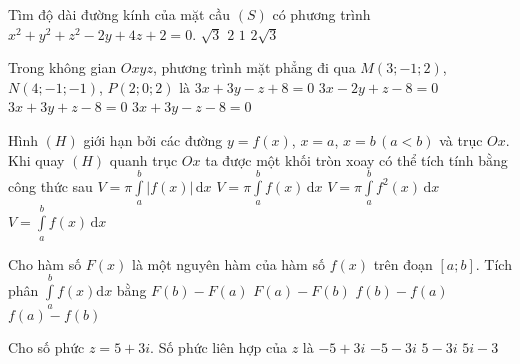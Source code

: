 \begin{ex}%
Tìm độ dài đường kính của mặt cầu $(S)$ có phương trình $x^2+y^2+z^2-2y+4z+2=0$.
\choice
{$\sqrt{3}$}
{$2$}
{$1$}
{\True $2\sqrt{3}$}
\end{ex}

\begin{ex}%
Trong không gian $O x y z$, phương trình mặt phẳng đi qua $M(3 ;-1 ; 2)$, $N(4 ;-1 ;-1)$, $P(2 ; 0 ; 2)$ là
\choice
{$3 x+3 y-z+8=0$}
{$3 x-2 y+z-8=0$}
{\True $3 x+3 y+z-8=0$}
{$3 x+3 y-z-8=0$}
\end{ex}

\begin{ex}%
Hình $ (H) $  giới hạn bởi các đường  $ y=f(x) $,  $ x=a $, $ x=b \,(a<b)$    và trục  $ Ox $. Khi quay $ (H) $  quanh trục $ Ox $  ta được một khối tròn xoay có thể tích tính bằng công thức sau
\choice
{$ V=\pi \displaystyle\int\limits_a^b\vert f(x)\vert\mathrm{\,d}x $}
{$ V=\pi \displaystyle\int\limits_a^b f(x)\mathrm{\,d}x $}
{\True $ V=\pi \displaystyle\int\limits_a^b f^2(x)\mathrm{\,d}x $}
{$ V= \displaystyle\int\limits_a^b f(x)\mathrm{\,d}x $}
\end{ex}

\begin{ex}%
Cho hàm số $F(x)$ là một nguyên hàm của hàm số $f(x)$ trên đoạn $[a;b]$. Tích phân $\displaystyle\int\limits_a^b f(x)\mathrm{d}x$ bằng
\choice
{\True $F(b)-F(a)$}
{$F(a)-F(b)$}
{$f(b)-f(a)$}
{$f(a)-f(b)$}
\end{ex}

\begin{ex}%
Cho số phức $z=5+3i$. Số phức liên hợp của $z$ là
\choice
{$-5+3i$}
{$-5-3i$}
{\True $5-3i$}
{$5i-3$}
\end{ex}

